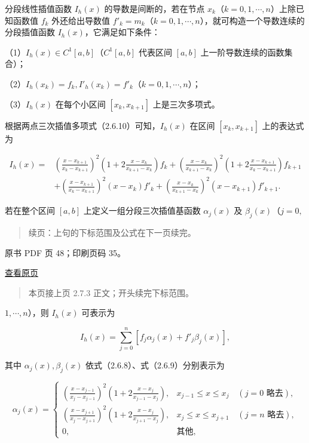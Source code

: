 分段线性插值函数 \(I_h(x)\) 的导数是间断的，若在节点 \(x_k\)（\(k=0,1,\cdots,n\)）上除已知函数值 \(f_k\) 外还给出导数值 \(f'_k=m_k\)（\(k=0,1,\cdots,n\)），就可构造一个导数连续的分段插值函数 \(I_h(x)\)，它满足如下条件：

（1）\(I_h(x)\in C^1[a,b]\)（\(C^1[a,b]\) 代表区间 \([a,b]\) 上一阶导数连续的函数集合）；

（2）\(I_h(x_k)=f_k,I'_h(x_k)=f'_k\)（\(k=0,1,\cdots,n\)）；

（3）\(I_h(x)\) 在每个小区间 \([x_k,x_{k+1}]\) 上是三次多项式。

根据两点三次插值多项式（2.6.10）可知，\(I_h(x)\) 在区间 \([x_k,x_{k+1}]\) 上的表达式为

\[\begin{aligned}
I_h(x)={}&\left(\frac{x-x_{k+1}}{x_k-x_{k+1}}\right)^2\left(1+2\frac{x-x_k}{x_{k+1}-x_k}\right)f_k+\left(\frac{x-x_k}{x_{k+1}-x_k}\right)^2\left(1+2\frac{x-x_{k+1}}{x_k-x_{k+1}}\right)f_{k+1}\\
&+\left(\frac{x-x_{k+1}}{x_k-x_{k+1}}\right)^2(x-x_k)f'_k+\left(\frac{x-x_k}{x_{k+1}-x_k}\right)^2(x-x_{k+1})f'_{k+1}.
\end{aligned}\tag{2.7.5}\]

若在整个区间 \([a,b]\) 上定义一组分段三次插值基函数 \(\alpha_j(x)\) 及 \(\beta_j(x)\)（\(j=0,\)

\begin{quote}
续页：上句的下标范围及公式在下一页续完。
\end{quote}

\clearpage

原书 PDF 页 48；印刷页码 35。

\href{source-images/pdf-048.jpeg}{查看原页}

\begin{quote}
本页接上页 2.7.3 正文；开头续完下标范围。
\end{quote}

\(1,\cdots,n\)），则 \(I_h(x)\) 可表示为

\[I_h(x)=\sum_{j=0}^n[f_j\alpha_j(x)+f'_j\beta_j(x)],\tag{2.7.6}\]

其中 \(\alpha_j(x),\beta_j(x)\) 依式（2.6.8）、式（2.6.9）分别表示为

\[\alpha_j(x)=\begin{cases}
\displaystyle\left(\frac{x-x_{j-1}}{x_j-x_{j-1}}\right)^2\left(1+2\frac{x-x_j}{x_{j-1}-x_j}\right),&x_{j-1}\leqslant x\leqslant x_j\quad(j=0\text{ 略去}),\\[6pt]
\displaystyle\left(\frac{x-x_{j+1}}{x_j-x_{j+1}}\right)^2\left(1+2\frac{x-x_j}{x_{j+1}-x_j}\right),&x_j\leqslant x\leqslant x_{j+1}\quad(j=n\text{ 略去}),\\[6pt]
0,&\text{其他},
\end{cases}\tag{2.7.7}\]

